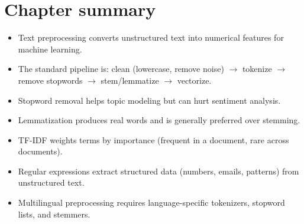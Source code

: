 \section{Chapter summary}

\begin{itemize}
  \item Text preprocessing converts unstructured text into numerical features for machine learning.
  \item The standard pipeline is: clean (lowercase, remove noise) $\to$ tokenize $\to$ remove stopwords $\to$ stem/lemmatize $\to$ vectorize.
  \item Stopword removal helps topic modeling but can hurt sentiment analysis.
  \item Lemmatization produces real words and is generally preferred over stemming.
  \item TF-IDF weights terms by importance (frequent in a document, rare across documents).
  \item Regular expressions extract structured data (numbers, emails, patterns) from unstructured text.
  \item Multilingual preprocessing requires language-specific tokenizers, stopword lists, and stemmers.
\end{itemize}
